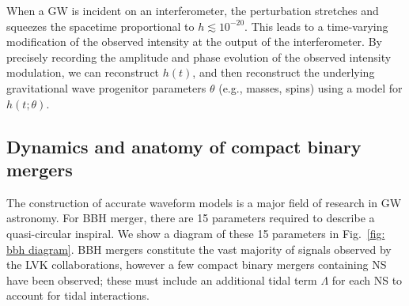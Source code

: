 \begin{refsection}
When a \ac{GW} is incident on an interferometer, the perturbation stretches and squeezes the spacetime proportional to $h\lesssim 10^{-20}$. This leads to a time-varying modification of the observed intensity at the output of the interferometer. By precisely recording the amplitude and phase evolution of the observed intensity modulation, we can reconstruct $h(t)$, and then reconstruct the underlying gravitational wave progenitor parameters $\theta$ (e.g., masses, spins) using a model for $h(t;\theta)$. 

\subsection{Dynamics and anatomy of compact binary mergers}


The construction of accurate waveform models is a major field of research in \ac{GW} astronomy. For \ac{BBH} merger, there are 15 parameters required to describe a quasi-circular inspiral. We show a diagram of these 15 parameters in Fig.~\ref{fig: bbh diagram}. \ac{BBH} mergers constitute the vast majority of signals observed by the \ac{LVK} collaborations, however a few compact binary mergers containing \ac{NS} have been observed; these must include an additional tidal term $\Lambda$ for each \ac{NS} to account for tidal interactions. 


\end{refsection}
